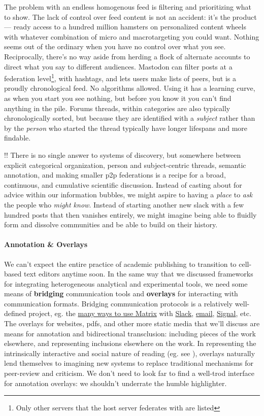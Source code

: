 \documentclass[notoc]{tufte-book}
\begin{document}
The problem with an endless homogenous feed is filtering and
prioritizing what to show. The lack of control over feed content is not
an accident: it's the product --- ready access to a hundred million
hamsters on personalized content wheels with whatever combination of
micro and macrotargeting you could want. Nothing seems out of the
ordinary when you have no control over what you see. Reciprocally,
there's no way aside from herding a flock of alternate accounts to
direct what you say to different audiences. Mastodon can filter posts at
a federation level\footnote{Only other servers that the host server
  federates with are listed}, with hashtags, and lets users make lists
of peers, but is a proudly chronological feed. No algorithms allowed.
Using it has a learning curve, as when you start you see nothing, but
before you know it you can't find anything in the pile. Forums threads,
within categories are also typically chronologically sorted, but because
they are identified with a \emph{subject} rather than by the
\emph{person} who started the thread typically have longer lifespans and
more findable.

!! There is no single answer to systems of discovery, but somewhere
between explicit categorical organization, person and subject-centric
threads, semantic annotation, and making smaller p2p federations is a
recipe for a broad, continuous, and cumulative scientific discussion.
Instead of casting about for advice within our information bubbles, we
might aspire to having a \emph{place} to \emph{ask} the people who
\emph{might know}. Instead of starting another new slack with a few
hundred posts that then vanishes entirely, we might imagine being able
to fluidly form and dissolve communities and be able to build on their
history.


\paragraph{Annotation \& Overlays}

We can't expect the entire practice of academic publishing to transition
to cell-based text editors anytime soon. In the same way that we
discussed frameworks for integrating heterogeneous analytical and
experimental tools, we need some means of \textbf{bridging}
communication tools and \textbf{overlays} for interacting with
communication formats. Bridging communication protocols is a relatively
well-defined project, eg. the \href{https://matrix.org/bridges/}{many
ways to use Matrix} with
\href{https://matrix.org/bridges/\#slack}{Slack},
\href{https://matrix.org/bridges/\#email}{email},
\href{https://matrix.org/bridges/\#signal}{Signal}, etc. The overlays
for websites, pdfs, and other more static media that we'll discuss are
means for annotation and bidirectional transclusion: including pieces of
the work elsewhere, and representing inclusions elsewhere on the work.
In representing the intrinsically interactive and social nature of
reading (eg. see \citep{jacksonMarginaliaReadersWriting2001} ),
overlays naturally lend themselves to imagining new systems to replace
traditional mechanisms for peer-review and criticism. We don't need to
look far to find a well-trod interface for annotation overlays: we
shouldn't underrate the humble highlighter.
\end{document}
